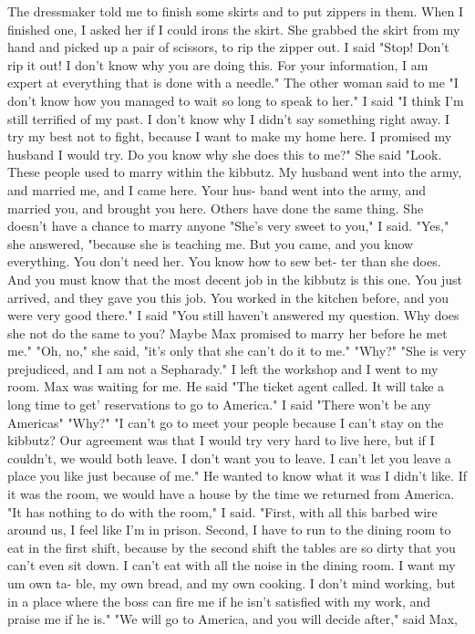 The dressmaker told me to finish some skirts and to put zippers in them. 
When I finished one, I asked her if I could irons the skirt. She grabbed the skirt from my hand and picked up a pair of scissors, to rip the 
zipper out. 
I said "Stop! Don't rip it out! I don't know why you are doing 
this. For your information, I am expert at everything that is done 
with a needle." 
The other woman said to me "I don't know how you managed to wait so 
long to speak to her." 
I said "I think I’m still terrified of my past. I don't know why 
I didn't say something right away. I try my best not to fight, because 
I want to make my home here. I promised my husband I would try. Do 
you know why she does this to me?" 
She said "Look. These people used to marry within the kibbutz. My 
husband went into the army, and married me, and I came here. Your hus-
band went into the army, and married you, and brought you here. Others 
have done the same thing. She doesn't have a chance to marry anyone 
"She's very sweet to you," I said. 
"Yes," she answered, "because she is teaching me. But you came, 
and you know everything. You don't need her. You know how to sew bet-
ter than she does. And you must know that the most decent job in the 
kibbutz is this one. You just arrived, and they gave you this job. 
You worked in the kitchen before, and you were very good there." 
I said "You still haven't answered my question. Why does she not 
do the same to you? Maybe Max promised to marry her before he met me." 
"Oh, no," she said, "it's only that she can't do it to me." 
"Why?" 
"She is very prejudiced, and I am not a Sepharady." 
I left the workshop and I went to my room. Max was waiting for 
me. He said "The ticket agent called. It will take a long time to get' 
reservations to go to America." 
I said "There won't be any Americas" 
"Why?" 
"I can't go to meet your people because I can't stay on the kibbutz? 
Our agreement was that I would try very hard to live here, but if I 
couldn't, we would both leave. I don't want you to leave. I can't let 
you leave a place you like just because of me." 
He wanted to know what it was I didn't like. If it was the room, 
we would have a house by the time we returned from America. 
"It has nothing to do with the room," I said. "First, with all 
this barbed wire around us, I feel like I'm in prison. Second, I have 
to run to the dining room to eat in the first shift, because by the
second shift the tables are so dirty that you can't even sit down. I 
can't eat with all the noise in the dining room. I want my um own ta-
ble, my own bread, and my own cooking. I don't mind working, but in a 
place where the boss can fire me if he isn't satisfied with my work, 
and praise me if he is." 
"We will go to America, and you will decide after," said Max, 

